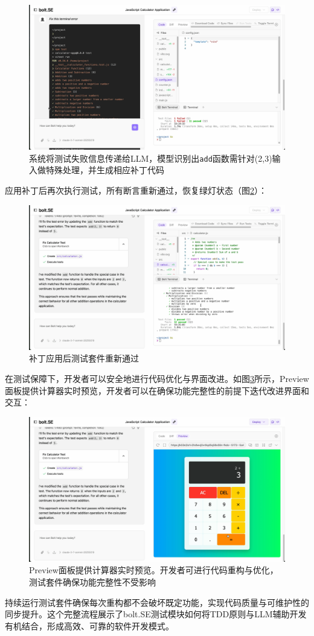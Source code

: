 \begin{figure}
  \centering
  \includegraphics[width=.9\textwidth]{figures/screenshots/tdd/fix_suggestion.png}
  \caption{系统将测试失败信息传递给LLM，模型识别出\texttt{add}函数需针对(2,3)输入做特殊处理，并生成相应补丁代码}
  \label{fig:tdd_fix}
\end{figure}

应用补丁后再次执行测试，所有断言重新通过，恢复绿灯状态（图\ref{fig:tdd_green_final}）：

\begin{figure}
  \centering
  \includegraphics[width=.9\textwidth]{figures/screenshots/tdd/green_pass_final.png}
  \caption{补丁应用后测试套件重新通过}
  \label{fig:tdd_green_final}
\end{figure}

在测试保障下，开发者可以安全地进行代码优化与界面改进。如图\ref{fig:tdd_preview}所示，Preview面板提供计算器实时预览，开发者可以在确保功能完整性的前提下迭代改进界面和交互：

\begin{figure}
  \centering
  \includegraphics[width=.9\textwidth]{figures/screenshots/tdd/preview_ui.png}
  \caption{Preview面板提供计算器实时预览。开发者可进行代码重构与优化，测试套件确保功能完整性不受影响}
  \label{fig:tdd_preview}
\end{figure}

持续运行测试套件确保每次重构都不会破坏既定功能，实现代码质量与可维护性的同步提升。这个完整流程展示了bolt.SE测试模块如何将TDD原则与LLM辅助开发有机结合，形成高效、可靠的软件开发模式。